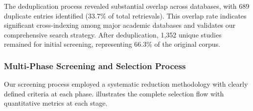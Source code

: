 \documentclass[acmsmall]{acmart}
\begin{document}
The deduplication process revealed substantial overlap across databases, with 689 duplicate entries identified (33.7\% of total retrievals). This overlap rate indicates significant cross-indexing among major academic databases and validates our comprehensive search strategy. After deduplication, 1,352 unique studies remained for initial screening, representing 66.3\% of the original corpus.

\subsubsection{Multi-Phase Screening and Selection Process}\label{subsubsec:phase-2-literature-search-and-study-selection:multi-phase-screening-and-selection-process}

Our screening process employed a systematic reduction methodology with clearly defined criteria at each phase.  illustrates the complete selection flow with quantitative metrics at each stage.
\end{document}
